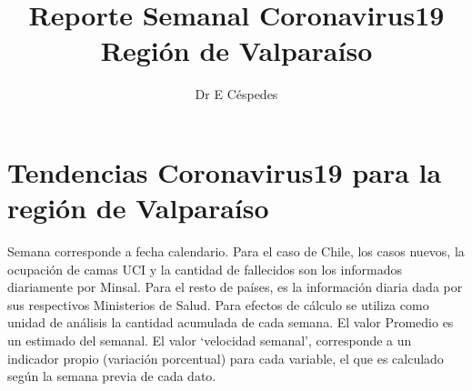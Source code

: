 \documentclass{article}
\title{Reporte Semanal Coronavirus19 Región de Valparaíso}
\author{Dr E Céspedes}
\date{\Fecha}
\begin{document}
\maketitle
\tableofcontents
 


\section{Tendencias Coronavirus19 para la región de Valparaíso}

Semana corresponde a fecha calendario. Para el caso de Chile, los casos nuevos, la ocupación de camas UCI y la cantidad de fallecidos son los informados diariamente por Minsal. Para el resto de países, es la información diaria dada por sus respectivos Ministerios de Salud. Para efectos de cálculo se utiliza como unidad de análisis la cantidad acumulada de cada semana. El valor Promedio es un estimado del semanal. El valor ‘velocidad semanal’, corresponde a un indicador propio (variación porcentual) para cada variable, el que es calculado según la semana previa de cada dato.
\end{document}
